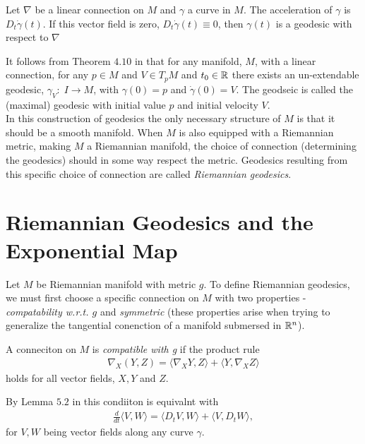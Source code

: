 \begin{definition}
Let $\nabla$ be a linear connection on $M$ and $\gamma$ a curve in $M$. The acceleration of $\gamma$ is $D_t \dot{\gamma}(t)$. If this vector field is zero, $D_t \dot{\gamma}(t) \equiv 0$, then $\gamma(t)$ is a geodesic with respect to $\nabla$
\end{definition}

It follows from Theorem $4.10$ in  that for any manifold, $M$, with a linear connection, for any $p \in M$ and $V \in T_pM$ and $t_0 \in \mathbb{R}$ there exists an un-extendable geodesic, $\gamma_V: \; I \rightarrow M$, with $\gamma(0) = p$ and $\dot{\gamma}(0) = V$. The geodseic is called the (maximal) geodesic with initial value $p$ and initial velocity $V$. \\[0.2 cm]

In this construction of geodesics the only necessary structure of $M$ is that it should be a smooth manifold. When $M$ is also equipped with a Riemannian metric, making $M$ a Riemannian manifold, the choice of connection (determining the geodesics) should in some way respect the metric. Geodesics resulting from this specific choice of connection are called \textit{Riemannian geodesics}.

\section{Riemannian Geodesics and the Exponential Map}

Let $M$ be Riemannian manifold with metric $g$. To define Riemannian geodesics, we must first choose a specific connection on $M$ with two properties - \textit{compatability w.r.t. $g$} and \textit{symmetric} (these properties arise when trying to generalize the tangential conenction of a manifold submersed in $\mathbb{R}^n$).

\begin{definition}
A conneciton on $M$ is \textit{compatible with g} if the product rule
\begin{align*}
\nabla_X (Y, Z) = \langle \nabla_X Y, Z \rangle + \langle Y, \nabla_X Z \rangle
\end{align*}
holds for all vector fields, $X, Y$ and $Z$.
\end{definition}

By Lemma $5.2$ in  this condiiton is equivalnt with
\begin{align*}
\frac{d}{dt} \langle V, W \rangle = \langle D_t V, W \rangle + \langle V, D_t W \rangle,
\end{align*} 
for $V, W$ being vector fields along any curve $\gamma$. \\[0.2 cm]

